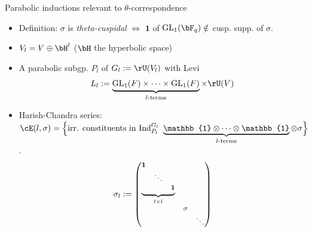 \documentclass[t,mathserif,11pt,usenames,dvipsnames]{beamer}
\theoremstyle{plain}
\theoremstyle{definition}
\newcommand{\bfone}{\mathbf{1}}
\newcommand{\bbone}{\mathbb{1}}
\def\GL{\mathrm{GL}}
\def\Ind{{\rm Ind}}
\def\blue{\color{blue}}
\let\oldemph\emph
\def\emph#1{\oldemph{\blue #1}}
\begin{document}
\begin{frame}{Parabolic inductions relevant to $\theta$-correspondence}
  \begin{itemize}
    \item[]\hspace{-3em} {\color{blue}Definition: }$\sigma$ is \emph{theta-cuspidal}
          $\Leftrightarrow$  $\bfone$ of $\GL_{1}(\bF_{q}) \notin $
          cusp. supp. of $\sigma$. \pause
    \item $V_l = V \oplus \bH^l$ ($\bH$ the hyperbolic space) %
    \item A parabolic subgp. $P_l$ of $G_{l}:=\rU(V_l)$ with Levi \vspace{-.5em}
          \[
          L_l := \underbrace{\GL_1(F)\times \cdots \times \GL_1(F)}_{l\text{-terms}} \times \rU(V)
          \]
          \vspace{-1em}
          \pause
    \item Harish-Chandra series:
          $\cE(l,\sigma)=\Big\{\text{irr. constituents in }
           \Ind_{P_{l}}^{G_{l}}\  \underbrace{\bbone \otimes \cdots \otimes \bbone}_{l\text{-terms}} \otimes \sigma\Big\}$.
          \vspace{-.5em}\pause
          \[\footnotesize
          \sigma_{l} :=
          \begin{pmatrix}
            \underbrace{
            \begin{matrix}
              \bfone &     &  \\
                     & \ddots &\\
                     &     & \bfone \\
            \end{matrix}}_{l\times l} & \\
                     & \sigma &  \\
                     &   & \ddots  \\
          \end{pmatrix}
          \]
  \end{itemize}
\end{frame}
\end{document}
